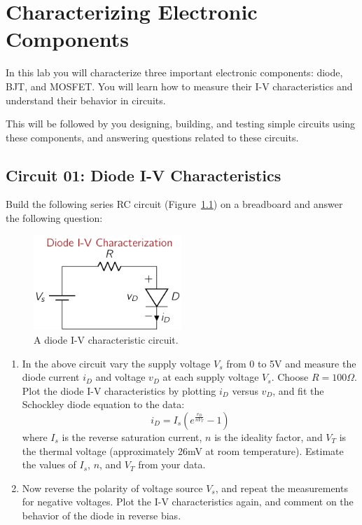 \chapter{Characterizing Electronic Components}\label{expt:02-elec-char}

In this lab you will characterize three important electronic components: diode, BJT, and MOSFET. You will learn how to measure their I-V characteristics and understand their behavior in circuits.

This will be followed by you designing, building, and testing simple circuits using these components, and answering questions related to these circuits. 

\section{Circuit 01: Diode I-V Characteristics}
Build the following series RC circuit (Figure~\ref{fig:expt02-01}) on a breadboard and answer the following question:
\begin{figure}[htbp]
    \centering
    \includegraphics[width=0.5\textwidth]{figures/expt02/expot02-diode-iv.pdf}
    \caption{A diode I-V characteristic circuit.}
    \label{fig:expt02-01}
\end{figure}
\begin{enumerate}
    \item In the above circuit vary the supply voltage $V_s$ from 0 to 5V and measure the diode current $i_D$ and voltage $v_D$ at each supply voltage $V_s$. Choose $R=100\Omega$. Plot the diode I-V characteristics by plotting $i_D$ versus $v_D$, and fit the Schockley diode equation to the data:
    \begin{equation}
        i_D = I_s \left( e^{\frac{v_D}{nV_T}} - 1 \right)
    \end{equation}
    where $I_s$ is the reverse saturation current, $n$ is the ideality factor, and $V_T$ is the thermal voltage (approximately 26mV at room temperature). Estimate the values of $I_s$, $n$, and $V_T$ from your data.
    \item Now reverse the polarity of voltage source $V_s$, and repeat the measurements for negative voltages. Plot the I-V characteristics again, and comment on the behavior of the diode in reverse bias.
\end{enumerate}

